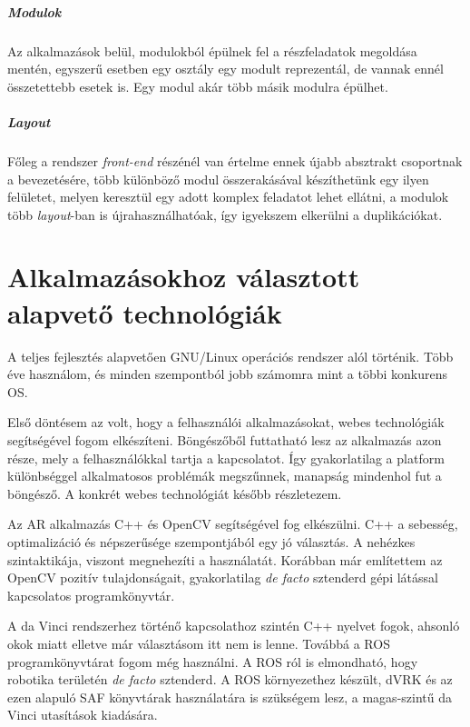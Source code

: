 \documentclass[12pt,a4paper,oneside]{report} %
\begin{document}
\subparagraph{Modulok}
Az alkalmazások belül, modulokból épülnek fel a részfeladatok megoldása mentén, egyszerű esetben egy osztály egy modult reprezentál, de vannak ennél összetettebb esetek is. Egy modul akár több másik modulra épülhet.

\subparagraph{Layout}
Főleg a rendszer \textit{front-end} részénél van értelme ennek újabb absztrakt csoportnak a bevezetésére, több különböző modul összerakásával készíthetünk egy ilyen felületet, melyen keresztül egy adott komplex feladatot lehet ellátni, a modulok több \textit{layout}-ban is újrahasználhatóak, így igyekszem elkerülni a duplikációkat.


\section{Alkalmazásokhoz választott alapvető technológiák}
A teljes fejlesztés alapvetően GNU/Linux operációs rendszer alól történik. Több éve használom, és minden szempontból jobb számomra mint a többi konkurens OS.
\par Első döntésem az volt, hogy a felhasználói alkalmazásokat, webes technológiák segítségével fogom elkészíteni. Böngészőből futtatható lesz  az alkalmazás azon része, mely a felhasználókkal tartja a kapcsolatot. Így gyakorlatilag a platform különbséggel alkalmatosos problémák megszűnnek, manapság mindenhol fut a böngésző. A konkrét webes technológiát később részletezem. 
\par Az AR alkalmazás C++ és OpenCV segítségével fog elkészülni. C++ a sebesség, optimalizáció és népszerűsége szempontjából egy jó választás. A nehézkes szintaktikája, viszont megnehezíti a használatát. Korábban már említettem az OpenCV pozitív tulajdonságait, gyakorlatilag \textit{de facto} sztenderd gépi látással kapcsolatos programkönyvtár. 
\par A da Vinci rendszerhez történő kapcsolathoz szintén C++ nyelvet fogok, ahsonló okok miatt elletve már választásom itt nem is lenne. Továbbá a ROS  programkönyvtárat fogom még használni.  A ROS ról is elmondható, hogy robotika területén \textit{de facto} sztenderd. A ROS környezethez készült, dVRK és az ezen alapuló SAF könyvtárak használatára is szükségem lesz, a magas-szintű da Vinci utasítások kiadására. 
\end{document}
